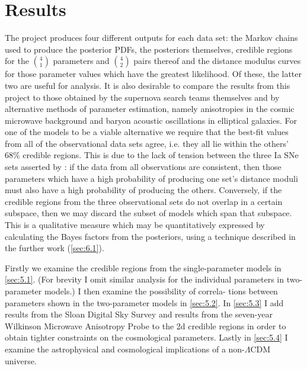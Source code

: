 \chapter{Results}
\label{ch:results}








The project produces four different outputs for each data set: the Markov chains used to produce the posterior PDFs, the posteriors themselves, credible regions for the $\binom{4}{1}$ parameters and $\binom{4}{2}$ pairs thereof and the distance modulus curves for those parameter values which have the greatest likelihood. Of these, the latter two are useful for analysis. It is also desirable to compare the results from this project to those obtained by the supernova search teams themselves and by alternative methods of parameter estimation, namely anisotropies in the cosmic microwave background and baryon acoustic oscillations in elliptical galaxies. For one of the models to be a viable alternative we require that the best-fit values from all of the observational data sets agree, i.e. they all lie within the others’ 68\% credible regions. This is due to the lack of tension between the three Ia SNe sets asserted by \cite{Kwan2009}: if the data from all observations are consistent, then those parameters which have a high probability of producing one set’s distance moduli must also have a high probability of producing the others. Conversely, if the credible regions from the three observational sets do not overlap in a certain subspace, then we may discard the subset of models which span that subspace. This is a qualitative measure which may be quantitatively expressed by calculating the Bayes factors from the posteriors, using a technique described in the further work (\cref{sec:6.1}). 

Firstly we examine the credible regions from the single-parameter models in \cref{sec:5.1}. (For brevity I omit similar analysis for the individual parameters in two-parameter models.) I then examine the possibility of correla- tions between parameters shown in the two-parameter models in \cref{sec:5.2}. In \cref{sec:5.3} I add \bao{} results from the Sloan Digital Sky Survey and \cmb{} results from the seven-year Wilkinson Microwave Anisotropy Probe to the 2d credible regions in order to obtain tighter constraints on the cosmological parameters. Lastly in \cref{sec:5.4} I examine the astrophysical and cosmological implications of a non-$\Lambda$CDM universe.

